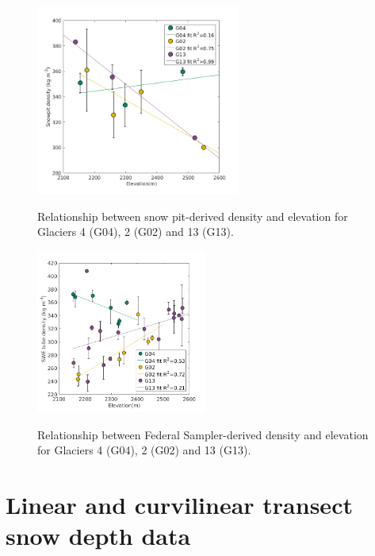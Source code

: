 \documentclass{sfuthesis}
\begin{document}
\begin{figure}
	\centering
	\includegraphics[width = 0.6\textwidth]{ElevationVsSnowpit_all.png}\\
	\caption{Relationship between snow pit-derived density and elevation for Glaciers 4 (G04), 2 (G02) and 13 (G13).}
	\label{fig:elev_snowpit}
\end{figure}


\begin{figure}
	\centering
	\includegraphics[width = 0.5\textwidth]{ElevationVsSWEtube_all.png}\\
	\caption{Relationship between Federal Sampler-derived density and elevation for Glaciers 4 (G04), 2 (G02) and 13 (G13).}
	\label{fig:elev_tube}
\end{figure}


\section{Linear and curvilinear transect snow depth data}
\end{document}
